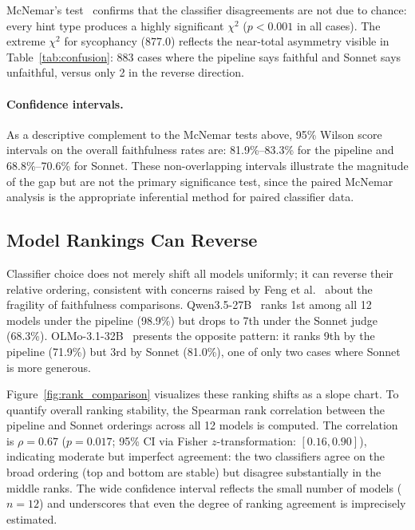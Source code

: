 McNemar's test~\cite{mcnemar1947note} confirms that the classifier disagreements are not due to chance: every hint type produces a highly significant $\chi^2$ ($p < 0.001$ in all cases). The extreme $\chi^2$ for sycophancy (877.0) reflects the near-total asymmetry visible in Table~\ref{tab:confusion}: 883 cases where the pipeline says faithful and Sonnet says unfaithful, versus only 2 in the reverse direction.

\paragraph{Confidence intervals.} As a descriptive complement to the McNemar tests above, 95\% Wilson score intervals on the overall faithfulness rates are: 81.9\%--83.3\% for the pipeline and 68.8\%--70.6\% for Sonnet. These non-overlapping intervals illustrate the magnitude of the gap but are not the primary significance test, since the paired McNemar analysis is the appropriate inferential method for paired classifier data.

\subsection{Model Rankings Can Reverse}

Classifier choice does not merely shift all models uniformly; it can reverse their relative ordering, consistent with concerns raised by Feng et al.~\cite{feng2025more} about the fragility of faithfulness comparisons. Qwen3.5-27B~\cite{qwen2024technical} ranks 1st among all 12 models under the pipeline (98.9\%) but drops to 7th under the Sonnet judge (68.3\%). OLMo-3.1-32B~\cite{groeneveld2024olmo} presents the opposite pattern: it ranks 9th by the pipeline (71.9\%) but 3rd by Sonnet (81.0\%), one of only two cases where Sonnet is more generous.

Figure~\ref{fig:rank_comparison} visualizes these ranking shifts as a slope chart. To quantify overall ranking stability, the Spearman rank correlation between the pipeline and Sonnet orderings across all 12 models is computed. The correlation is $\rho = 0.67$ ($p = 0.017$; 95\% CI via Fisher $z$-transformation: $[0.16, 0.90]$), indicating moderate but imperfect agreement: the two classifiers agree on the broad ordering (top and bottom are stable) but disagree substantially in the middle ranks. The wide confidence interval reflects the small number of models ($n = 12$) and underscores that even the degree of ranking agreement is imprecisely estimated.

